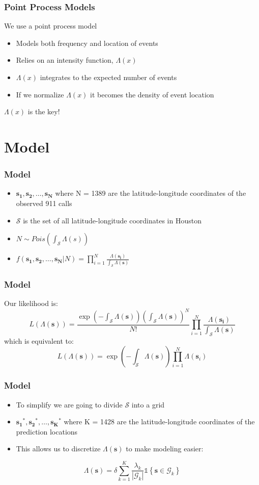 \documentclass[10pt, compress]{beamer}
\begin{document}
  \begin{frame}
    \frametitle{Point Process Models}
    We use a point process model
    \begin{itemize}
      \item Models both frequency and location of events
      \item Relies on an intensity function, $\Lambda(x)$
      \item $\Lambda(x)$ integrates to the expected number of events
      \item If we normalize $\Lambda(x)$ it becomes the density of event location
    \end{itemize} 
    $\Lambda(x)$ is the key!
  \end{frame}

  \section{Model}
  \begin{frame}
    \frametitle{Model}
      \begin{itemize}
        \item $\mathbf{s_1}, \mathbf{s_2}, \dots, \mathbf{s_N}$ where N = 1389 are the latitude-longitude coordinates of the observed 911 calls
        \item $\mathcal{S}$ is the set of all latitude-longitude coordinates in Houston
        \item $N \sim Pois(\int_{\mathcal{S}} \Lambda(s))$
        \item $f(\mathbf{s_1}, \mathbf{s_2}, \dots, \mathbf{s_N}|N) = \prod_{i=1}^{N} \frac{\Lambda(\mathbf{s_i})}{\int_{\mathcal{S}}\Lambda(\mathbf{s})}$ 
      \end{itemize}
  \end{frame}
  \begin{frame}
    \frametitle{Model}
    Our likelihood is:
      $$L(\Lambda(\mathbf{s})) = \frac{\exp(-\int_{\mathcal{S}}\Lambda(\mathbf{s}))\left(\int_{\mathcal{S}}\Lambda(\mathbf{s})\right)^{N}}{N!}
        \prod_{i=1}^{N}\frac{\Lambda(\mathbf{s_i})}{\int_{\mathcal{S}}\Lambda(\mathbf{s})}$$
    which is equivalent to:
      $$L(\Lambda(\mathbf{s})) = \exp\left(-\int_{\mathcal{S}}\Lambda(\mathbf{s})\right) \prod_{i=1}^{N}\Lambda(\mathbf{s}_i)$$
  \end{frame}
  \begin{frame}
    \frametitle{Model}
    \begin{itemize}
      \item To simplify we are going to divide $\mathcal{S}$ into a grid
      \item $\mathbf{s_1}^{*}, \mathbf{s_2}^{*}, \dots, \mathbf{s_K}^{*}$ where K = 1428 are the latitude-longitude coordinates of the  prediction locations
      \item This allows us to discretize $\Lambda(\mathbf{s})$ to make modeling easier:
    \end{itemize}
        $$ \Lambda(\mathbf{s}) = \delta \sum_{k=1}^K \frac{\lambda_k}{|\mathcal{G}_k|} \mathds{1} \left\{ \mathbf{s} \in \mathcal{G}_k \right\} $$
  \end{frame}
\end{document}
